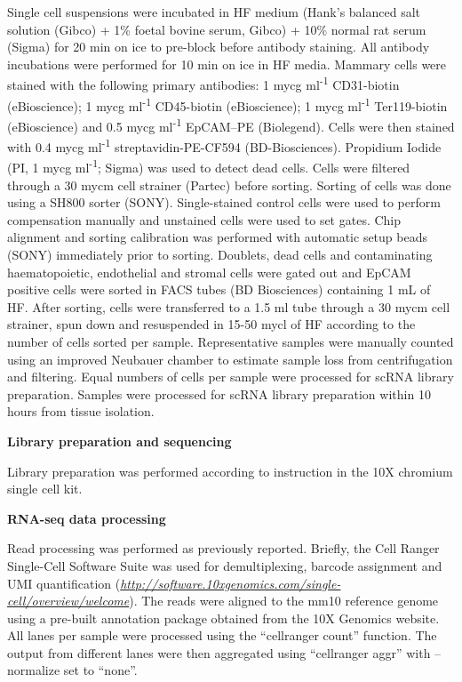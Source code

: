 \documentclass[titlepage, 12pt, oneside]{amsart}
\begin{document}
Single cell suspensions were incubated in HF medium (Hank's balanced salt solution (Gibco) + 1\% foetal bovine serum, Gibco) + 10\% normal rat serum (Sigma) for 20 min on ice to pre-block before antibody staining.
All antibody incubations were performed for 10 min on ice in HF media.
Mammary cells were stained with the following primary antibodies: 1 mycg ml\textsuperscript{-1} CD31-biotin (eBioscience); 1 mycg ml\textsuperscript{-1} CD45-biotin (eBioscience); 1 mycg ml\textsuperscript{-1} Ter119-biotin (eBioscience) and 0.5 mycg ml\textsuperscript{-1} EpCAM--PE (Biolegend).
Cells were then stained with 0.4 mycg ml\textsuperscript{-1} streptavidin-PE-CF594 (BD-Biosciences).
Propidium Iodide (PI, 1 mycg ml\textsuperscript{-1}; Sigma) was used to detect dead cells.
Cells were filtered through a 30 mycm cell strainer (Partec) before sorting.
Sorting of cells was done using a SH800 sorter (SONY).
Single-stained control cells were used to perform compensation manually and unstained cells were used to set gates.
Chip alignment and sorting calibration was performed with automatic setup beads (SONY) immediately prior to sorting.
Doublets, dead cells and contaminating haematopoietic, endothelial and stromal cells were gated out and EpCAM positive cells were sorted in FACS tubes (BD Biosciences) containing 1 mL of HF.
After sorting, cells were transferred to a 1.5 ml tube through a 30 mycm cell strainer, spun down and resuspended in 15-50 mycl of HF according to the number of cells sorted per sample.
Representative samples were manually counted using an improved Neubauer chamber to estimate sample loss from centrifugation and filtering.
Equal numbers of cells per sample were processed for scRNA library preparation.
Samples were processed for scRNA library preparation within 10 hours from tissue isolation.

\textbf{Library preparation and sequencing}

Library preparation was performed according to instruction in the 10X chromium single cell kit.

\textbf{RNA-seq data processing }

Read processing was performed as previously reported\autocite{Zheng2017}.
Briefly, the Cell Ranger Single-Cell Software Suite was used for demultiplexing, barcode assignment and UMI quantification (\href{http://software.10xgenomics.com/single-cell/overview/welcome}{\textit{http://software.10xgenomics.com/single-cell/overview/welcome}}).
The reads were aligned to the mm10 reference genome using a pre-built annotation package obtained from the 10X Genomics website.
All lanes per sample were processed using the ``cellranger count'' function.
The output from different lanes were then aggregated using ``cellranger aggr'' with --normalize set to ``none''.
\end{document}
